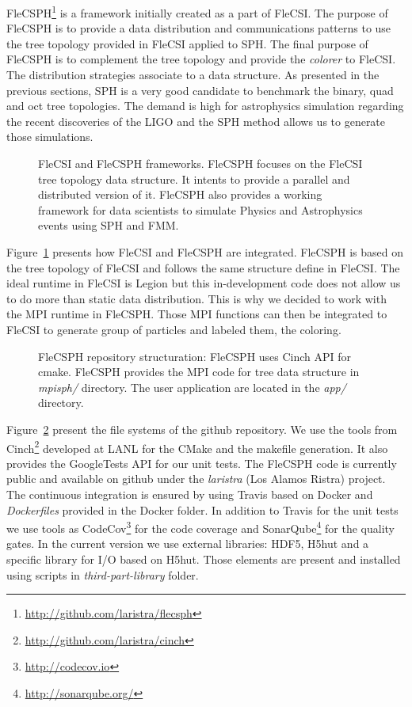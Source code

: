 FleCSPH\footnote{\url{http://github.com/laristra/flecsph}} is a framework initially created as a part of FleCSI. 
The purpose of FleCSPH is to provide a data distribution and communications patterns to use the tree topology provided in FleCSI applied to SPH.
The final purpose of FleCSPH is to complement the tree topology and provide the \textit{colorer} to FleCSI. 
The distribution strategies associate to a data structure.
As presented in the previous sections, SPH is a very good candidate to benchmark the binary, quad and oct tree topologies. 
The demand is high for astrophysics simulation regarding the recent discoveries of the LIGO and the SPH method allows us to generate those simulations. 
\begin{figure}[t!]
\centering

\caption[FleCSI and FleCSPH framework]{FleCSI and FleCSPH frameworks. FleCSPH focuses on the FleCSI tree topology data structure. It intents to provide a parallel and distributed version of it. FleCSPH also provides a working framework for data scientists to simulate Physics and Astrophysics events using SPH and FMM.}
\label{fig:flecsi_flecsph_framework}
\end{figure}
Figure~\ref{fig:flecsi_flecsph_framework} presents how FleCSI and FleCSPH are integrated. 
FleCSPH is based on the tree topology of FleCSI and follows the same structure define in FleCSI. 
The ideal runtime in FleCSI is Legion but this in-development code does not allow us to do more than static data distribution. 
This is why we decided to work with the MPI runtime in FleCSPH. 
Those MPI functions can then be integrated to FleCSI to generate group of particles and labeled them, the coloring. 

\begin{figure}[t!]
\centering

\caption[FleCSPH repository structuration]{FleCSPH repository structuration: FleCSPH uses Cinch API for cmake. FleCSPH provides the MPI code for tree data structure in \textit{mpisph/} directory. The user application are located in the \textit{app/} directory.}
\label{fig:files_flecsph}
\end{figure}

Figure~\ref{fig:files_flecsph} present the file systems of the github repository. 
We use the tools from Cinch\footnote{\url{http://github.com/laristra/cinch}} developed at LANL for the CMake and the makefile generation. 
It also provides the GoogleTests API for our unit tests. 
The FleCSPH code is currently public and available on github under the \textit{laristra} (Los Alamos Ristra) project.
The continuous integration is ensured by using Travis based on Docker and \textit{Dockerfiles} provided in the Docker folder. 
In addition to Travis for the unit tests we use tools as CodeCov\footnote{\url{http://codecov.io}} for the code coverage and SonarQube\footnote{\url{http://sonarqube.org/}} for the quality gates. 
In the current version we use external libraries: HDF5, H5hut and a specific library for I/O based on H5hut. 
Those elements are present and installed using scripts in \textit{third-part-library} folder. 

